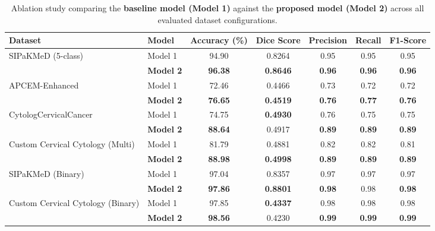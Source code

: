 \documentclass[pdflatex,sn-nature]{sn-jnl}%
\theoremstyle{thmstyleone}%
\theoremstyle{thmstyletwo}%
\theoremstyle{thmstylethree}%
\begin{document}
\begin{table}[htbp]
\centering
\caption{Ablation study comparing the \textbf{baseline model (Model 1)} against the \textbf{proposed model (Model 2)} across all evaluated dataset configurations.}
\label{tab:ablation_study}
\begin{tabular}{p{3.0cm} p{1.25cm} ccccc}
\toprule
\textbf{Dataset} & \textbf{Model} & \textbf{Accuracy (\%)} & \textbf{Dice Score} & \textbf{Precision} & \textbf{Recall} & \textbf{F1-Score} \\
\midrule

\multirow{2}{*}{\parbox{3.0cm}{SIPaKMeD (5-class)}}
 & Model 1 & 94.90 & 0.8264 & 0.95 & 0.95 & 0.95 \\
 & \textbf{Model 2} & \textbf{96.38} & \textbf{0.8646} & \textbf{0.96} & \textbf{0.96} & \textbf{0.96} \\
\midrule

\multirow{2}{*}{\parbox{3.0cm}{APCEM-Enhanced}}
 & Model 1 & 72.46 & 0.4466 & 0.73 & 0.72 & 0.72 \\
 & \textbf{Model 2} & \textbf{76.65} & \textbf{0.4519} & \textbf{0.76} & \textbf{0.77} & \textbf{0.76} \\
\midrule

\multirow{2}{*}{\parbox{3.0cm}{CytologCervicalCancer}}
 & Model 1 & 74.75 & \textbf{0.4930} & 0.76 & 0.75 & 0.75 \\
 & \textbf{Model 2} & \textbf{88.64} & 0.4917 & \textbf{0.89} & \textbf{0.89} & \textbf{0.89} \\
\midrule

\multirow{2}{*}{\parbox{3.0cm}{Custom Cervical Cytology (Multi)}}
 & Model 1 & 81.79 & 0.4881 & 0.82 & 0.82 & 0.81 \\
 & \textbf{Model 2} & \textbf{88.98} & \textbf{0.4998} & \textbf{0.89} & \textbf{0.89} & \textbf{0.89} \\
\midrule

\multirow{2}{*}{\parbox{3.0cm}{SIPaKMeD (Binary)}}
 & Model 1 & 97.04 & 0.8357 & 0.97 & 0.97 & 0.97 \\
 & \textbf{Model 2} & \textbf{97.86} & \textbf{0.8801} & \textbf{0.98} & 0.98 & \textbf{0.98} \\
\midrule

\multirow{2}{*}{\parbox{3.2cm}{Custom Cervical Cytology (Binary)}}
 & Model 1 & 97.85 & \textbf{0.4337} & 0.98 & 0.98 & 0.98 \\
 & \textbf{Model 2} & \textbf{98.56} & 0.4230 & \textbf{0.99} & \textbf{0.99} & \textbf{0.99} \\

\bottomrule
\end{tabular}
\end{table}
\end{document}
